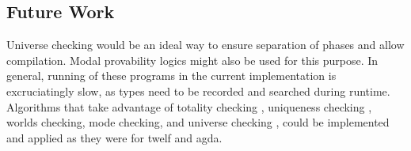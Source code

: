 \subsection{Future Work}

Universe checking would be an ideal way to ensure separation of phases and allow compilation. 
Modal provability logics might also be used for this purpose.  
In general, running of these programs in the current implementation is excruciatingly slow, 
as types need to be recorded and searched during runtime.  
Algorithms that take advantage of totality checking \citep{altenkirch2010termination}, 
uniqueness checking \citep{anderson2004verifying}, 
worlds checking\citep{anderson2004verifying}, 
mode checking\citep{anderson2004verifying}, 
and universe checking \citep{harper1991type}, 
could be implemented and applied as they were for twelf and agda.  
